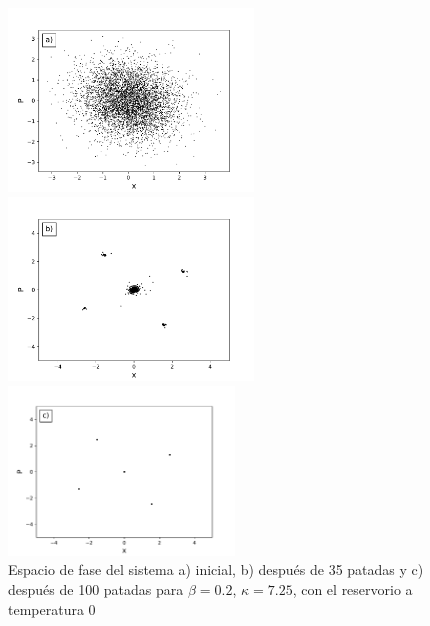 \documentclass[letterpaper,12pt,oneside]{book}
\begin{document}
\begin{figure}[h!]
	\centering
	\begin{minipage}{0.32\textwidth}
		\includegraphics[width=6.5cm]{Figs/PhaseSpaceInitial}
	\end{minipage}
	\begin{minipage}{0.32\textwidth}
		\includegraphics[width=6.5cm]{Figs/PhaseSpaceK35}
	\end{minipage}
	\begin{minipage}{0.32\textwidth}
		\includegraphics[width=6cm]{Figs/PhaseSpaceK100}
	\end{minipage}
	\caption{Espacio de fase del sistema a) inicial, b) después de 35 patadas y c) después de 100 patadas para $\beta=0.2$, $\kappa=7.25$, con el reservorio a temperatura 0}
	\label{fig:Atractores1}
	
\end{figure}
\end{document}
